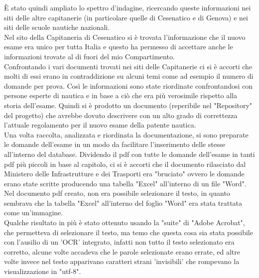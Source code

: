 È stato quindi ampliato lo spettro d'indagine, ricercando queste informazioni nei siti delle altre capitanerie (in particolare quelle di Cesenatico e di Genova) e nei siti delle scuole nautiche nazionali.\\
Nel sito della Capitaneria di Cesenatico si è trovata l'informazione che il nuovo esame era unico per tutta Italia e questo ha permesso di accettare anche le informazioni trovate al di fuori del mio Compartimento.\\
Confrontando i vari documenti trovati nei siti delle Capitanerie ci si è accorti che molti di essi erano in contraddizione su alcuni temi come ad esempio il numero di domande per prova. Così le informazioni sono state riordinate confrontandosi con persone esperte di nautica e in base a ciò che era più verosimile rispetto alla storia dell'esame. Quindi si è prodotto un documento (reperibile nel "Repository" del progetto) che avrebbe dovuto descrivere con un alto grado di correttezza l'attuale regolamento per il nuovo esame della patente nautica.\\
Una volta raccolta, analizzata e riordinata la documentazione, si sono preparate le domande dell'esame in un modo da facilitare l'inserimento delle stesse all'interno del database. Dividendo il pdf con tutte le domande dell'esame in tanti pdf più piccoli in base al capitolo, ci si è accorti che il documento rilasciato dal Ministero delle Infrastrutture e dei Trasporti era "bruciato" ovvero le domande erano state scritte producendo una tabella "Excel" all'interno di un file "Word". Nel documento pdf creato, non era possibile selezionare il testo, in quanto sembrava che la tabella "Excel" all'interno del foglio "Word" era stata trattata come un'immagine.\\
Qualche risultato in più è stato ottenuto usando la "suite" di "Adobe Acrobat", che permetteva di selezionare il testo, ma temo che questa cosa sia stata possibile con l'ausilio di un 'OCR' integrato, infatti non tutto il testo selezionato era corretto, alcune volte accadeva che le parole selezionate erano errate, ed altre volte invece nel testo apparivano caratteri strani 'invisibili' che rompevano la visualizzazione in "utf-8". 

